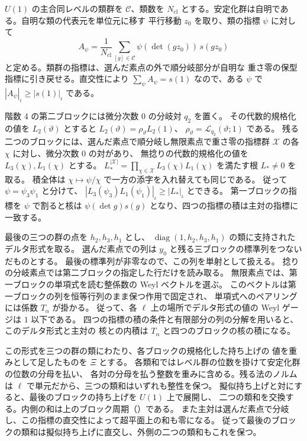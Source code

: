 \(U(1)\) の主合同レベルの類群を \(\mathcal C\)、類数を \(N_\mathrm{cl}\)
とする。安定化群は自明である。自明な類の代表元を単位元に移す
平行移動 \(z_0\) を取り、類の指標 \(\psi\) に対して
\[
 A_\psi=\frac1{N_\mathrm{cl}}\sum_{[g]\in\mathcal C}
                 \psi(\det(gz_0))\,s(gz_0)
\]
と定める。類群の指標は、選んだ素点の外で順分岐部分が自明な
重さ零の保型指標に引き戻せる。直交性により \(\sum_\psi A_\psi=s(1)\)
なので、ある \(\psi\) で \(|A_\psi|_\iota\ge|s(1)|_\iota\) である。

階数 \(4\) の第二ブロックには微分次数 \(0\) の分岐対 \(q_2\) を置く。
その代数的規格化の値を \(L_2(\vartheta)\) とすると
\(L_2(\vartheta)=\rho_\vartheta L_2(1)\)、
\(\rho_\vartheta=\mathcal L_{q_2}(\vartheta;1)\) である。
残る二つのブロックには、選んだ素点で順分岐し無限素点で重さ零の指標群
\(\mathcal X\) の各 \(\chi\) に対し、微分次数 \(0\) の対があり、
無捻りの代数的規格化の値を \(L_3(\chi),L_1(\chi)\) とする。
\(L_\ast^{|\mathcal X|}=\prod_{\chi\in\mathcal X}L_3(\chi)L_1(\chi)\)
を満たす根 \(L_\ast\ne0\) を取る。
積全体は \(\chi\mapsto\psi/\chi\) で一方の添字を入れ替えても同じである。
従って \(\psi=\psi_3\psi_1\) と分けて、
\(|L_3(\psi_3)L_1(\psi_1)|_\iota\ge|L_\ast|_\iota\) とできる。
第一ブロックの指標を \(\psi\) で割ると核は
\(\psi(\det g)s(g)\) となり、四つの指標の積は主対の指標に一致する。

最後の三つの群の点を \(h_2,h_3,h_1\) とし、
\(\operatorname{diag}(1,h_2,h_3,h_1)\) の類に支持されたデルタ形式を取る。
選んだ素点での列は \(y_0\) と残る三ブロックの標準列をつないだものとする。
最後の標準列が非零なので、この列を単射として扱える。
捻りの分岐素点では第二ブロックの指定した行だけを読み取る。
無限素点では、第一ブロックの単項式を読む整係数の Weyl ベクトルを選ぶ。
このベクトルは第一ブロックの列を恒等行列のまま保つ作用で固定され、
単項式へのペアリングには係数 \(T_\alpha\) が掛かる。
従って、各 \(\ell\) 上の場所でデルタ形式の値の Weyl ゲージは \(1\) 以下である。
四つの指標の積の条件と有限部分の列の分解を用いると、このデルタ形式と主対の
核との内積は \(T_\alpha\) と四つのブロックの核の積になる。

この形式を三つの群の類にわたり、各ブロックの規格化した持ち上げの
値を重みとして足したものを \(\Xi\) とする。
各類和ではレベル群の位数を掛けて安定化群の位数の分母を払い、
各対の分母を払う整数を重みに含める。残る法のノルムは
\(\ell\) で単元だから、三つの類和はいずれも整性を保つ。
擬似持ち上げと対にすると、最後のブロックの持ち上げを \(U(1)\) 上で展開し、
二つの類和を交換する。内側の和は上のブロック周期（）である。
また主対は選んだ素点で分岐し、この指標の直交性によって超平面上の和も零になる。
従って最後のブロックの類和は擬似持ち上げに直交し、外側の二つの類和もこれを保つ。

